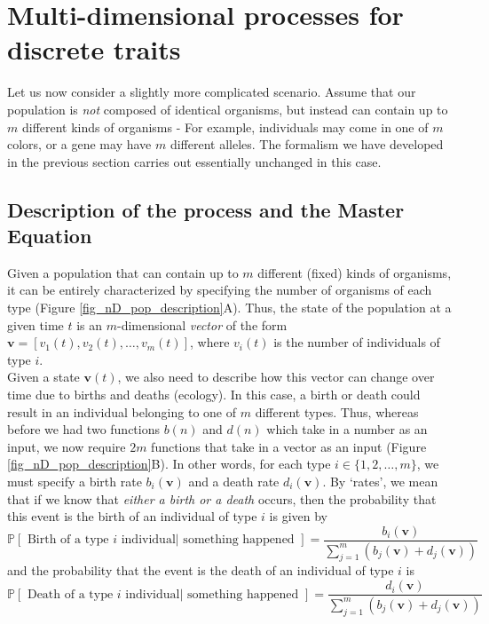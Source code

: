 \section{Multi-dimensional processes for discrete traits}\label{sec_nD_processes}
Let us now consider a slightly more complicated scenario. Assume that our population is \emph{not} composed of identical organisms, but instead can contain up to $m$ different kinds of organisms - For example, individuals may come in one of $m$ colors, or a gene may have $m$ different alleles. The formalism we have developed in the previous section carries out essentially unchanged in this case.

\subsection{Description of the process and the Master Equation}
Given a population that can contain up to $m$ different (fixed) kinds of organisms, it can be entirely characterized by specifying the number of organisms of each type (Figure \ref{fig_nD_pop_description}A). Thus, the state of the population at a given time $t$ is an $m$-dimensional \emph{vector} of the form $\mathbf{v} = [v_1(t),v_2(t),\ldots,v_m(t)]$, where $v_i(t)$ is the number of individuals of type $i$.\\
Given a state $\mathbf{v}(t)$,  we also need to describe how this vector can change over time due to births and deaths (ecology). In this case, a birth or death could result in an individual belonging to one of $m$ different types. Thus, whereas before we had two functions $b(n)$ and $d(n)$ which take in a number as an input, we now require $2m$ functions that take in a vector as an input (Figure \ref{fig_nD_pop_description}B). In other words, for each type $i \in \{1,2,\ldots,m\}$, we must specify a birth rate $b_i(\mathbf{v})$ and a death rate $d_i(\mathbf{v})$. By `rates', we mean that if we know that \emph{either a birth or a death} occurs, then the probability that this event is the birth of an individual of type $i$ is given by
\begin{equation*}
\mathbb{P}[\textrm{ Birth of a type $i$ individual} | \textrm{ something happened }] = \frac{b_i(\mathbf{v})}{\sum\limits_{j=1}^{m}(b_j(\mathbf{v})+d_j(\mathbf{v}))}
\end{equation*}
and the probability that the event is the death of an individual of type $i$ is
\begin{equation*}
\mathbb{P}[\textrm{ Death of a type $i$ individual} | \textrm{ something happened }] = \frac{d_i(\mathbf{v})}{\sum\limits_{j=1}^{m}(b_j(\mathbf{v})+d_j(\mathbf{v}))}
\end{equation*}

